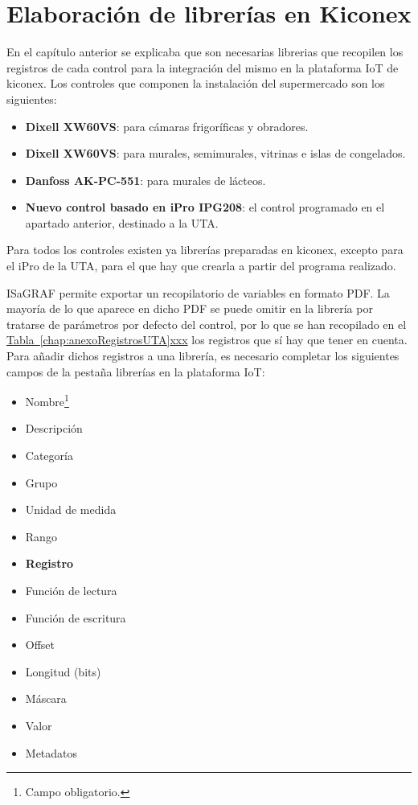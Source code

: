 \section{Elaboración de librerías en Kiconex}
\label{sec:librerias}
En el capítulo anterior se explicaba que son necesarias librerias que recopilen los registros de cada control para la integración del mismo en la plataforma IoT de kiconex. Los controles que componen la instalación del supermercado son los siguientes:

\begin{itemize}
  \item \textbf{Dixell XW60VS}: para cámaras frigoríficas y obradores.
  \item \textbf{Dixell XW60VS}: para murales, semimurales, vitrinas e islas de congelados.
  \item \textbf{Danfoss AK-PC-551}: para murales de lácteos.
  \item \textbf{Nuevo control basado en iPro IPG208}: el control programado en el apartado anterior, destinado a la UTA.
\end{itemize}

Para todos los controles existen ya librerías preparadas en kiconex, excepto para el iPro de la UTA, para el que hay que crearla a partir del programa realizado. 

ISaGRAF permite exportar un recopilatorio de variables en formato PDF. La mayoría de lo que aparece en dicho PDF se puede omitir en la librería por tratarse de parámetros por defecto del control, por lo que se han recopilado en el \hyperref[chap:anexoRegistrosUTA]{Tabla~\ref{chap:anexoRegistrosUTA}xxx} los registros que sí hay que tener en cuenta. Para añadir dichos registros a una librería, es necesario completar los siguientes campos de la pestaña librerías en la plataforma IoT:

\begin{itemize}
  \item Nombre\footnote[1]{Campo obligatorio.}
  \item Descripción\footnotemark[1]
  \item Categoría\footnotemark[1]
  \item Grupo
  \item Unidad de medida
  \item Rango
  \item \textbf{Registro\footnotemark[1]}
  \item Función de lectura
  \item Función de escritura
  \item Offset
  \item Longitud (bits)\footnotemark[1]
  \item Máscara
  \item Valor
  \item Metadatos
\end{itemize}

